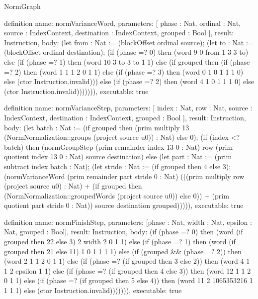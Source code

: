 \begin{lexlean}{NormGraph}
\begin{semanticmodule}
definition{
  name: normVarianceWord,
  parameters: [
    phase : Nat,
    ordinal : Nat,
    source : IndexContext,
    destination : IndexContext,
    grouped : Bool
  ],
  result: Instruction,
  body: (let from : Nat := (blockOffset ordinal source); (let to : Nat := (blockOffset ordinal destination); (if (phase =? 0) then (word 9 0 from 1 3 3 to) else (if (phase =? 1) then (word 10 3 to 3 to 1 1) else (if grouped then (if (phase =? 2) then (word 1 1 1 2 0 1 1) else (if (phase =? 3) then (word 0 1 0 1 1 1 0) else (ctor Instruction.invalid))) else (if (phase =? 2) then (word 4 1 0 1 1 1 0) else (ctor Instruction.invalid))))))),
  executable: true
}

definition{
  name: normVarianceStep,
  parameters: [
    index : Nat,
    row : Nat,
    source : IndexContext,
    destination : IndexContext,
    grouped : Bool
  ],
  result: Instruction,
  body: (let batch : Nat := (if grouped then (prim multiply 13 (NormNormalization::groups (project source u0)) : Nat) else 0); (if (index <? batch) then (normGroupStep (prim remainder index 13 0 : Nat) row (prim quotient index 13 0 : Nat) source destination) else (let part : Nat := (prim subtract index batch : Nat); (let stride : Nat := (if grouped then 4 else 3); (normVarianceWord (prim remainder part stride 0 : Nat) (((prim multiply row (project source u0) : Nat) + (if grouped then (NormNormalization::groupedWords (project source u0)) else 0)) + (prim quotient part stride 0 : Nat)) source destination grouped))))),
  executable: true
}

definition{
  name: normFinishStep,
  parameters: [phase : Nat, width : Nat, epsilon : Nat, grouped : Bool],
  result: Instruction,
  body: (if (phase =? 0) then (word (if grouped then 22 else 3) 2 width 2 0 1 1) else (if (phase =? 1) then (word (if grouped then 21 else 11) 1 0 1 1 1 1) else (if (grouped && (phase =? 2)) then (word 2 1 1 2 0 1 1) else (if (phase =? (if grouped then 3 else 2)) then (word 4 1 1 2 epsilon 1 1) else (if (phase =? (if grouped then 4 else 3)) then (word 12 1 1 2 0 1 1) else (if (phase =? (if grouped then 5 else 4)) then (word 11 2 1065353216 1 1 1 1) else (ctor Instruction.invalid))))))),
  executable: true
}


\end{semanticmodule}
\end{lexlean}
